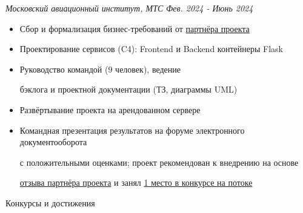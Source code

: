 \documentclass[14pt, a4paper, oneside]{extarticle}
\begin{document}
\begin{flushleft}
	\vspace{-1\intextsep}
	\quad
	\textit{Московский авиационный институт, МТС}
	\hfill
	\textit{\small Фев. 2024 - Июнь 2024}
\end{flushleft}


\begin{itemize}
	\vspace{-2\intextsep}
    \item Сбор и формализация бизнес-требований от \href{https://vk.ru/kearkhipov}{партнёра проекта}
    \vspace{-0.8\intextsep}
    \item Проектирование сервисов (C4): Frontend и Backend контейнеры Flask 
	\vspace{-0.8\intextsep}
    \item Руководство командой (9 человек), ведение 
    
    \vspace{-0.5\intextsep}
    бэклога и проектной документации (ТЗ, диаграммы UML)
    \vspace{-0.8\intextsep}
    \item Развёртывание проекта на арендованном сервере
    \vspace{-0.8\intextsep}
    \item Командная презентация результатов на форуме электронного документооборота
    
    \vspace{-0.5\intextsep}
    с положительными оценками; проект рекомендован к внедрению на основе
    
    \vspace{-0.5\intextsep}
 	\href{https://github.com/Crazy5202/job_application_form/tree/main/portfolio/EDMS/%D0%9E%D1%82%D0%B7%D1%8B%D0%B2_%D0%B2%D0%BD%D0%B5%D0%B4%D1%80%D0%B5%D0%BD%D0%B8%D0%B5.pdf}{отзыва партнёра проекта} и занял \href{https://github.com/Crazy5202/job_application_form/tree/main/portfolio/EDMS/%D0%9F%D0%BE%D0%B1%D0%B5%D0%B4%D0%B8%D1%82%D0%B5%D0%BB%D1%8C_%D0%A6%D0%9A.pdf}{1 место в конкурсе на потоке}
\end{itemize}


\pagebreak


\begin{flushleft}
	\vspace{-\intextsep}
	\large Конкурсы и достижения
\end{flushleft}
\end{document}
